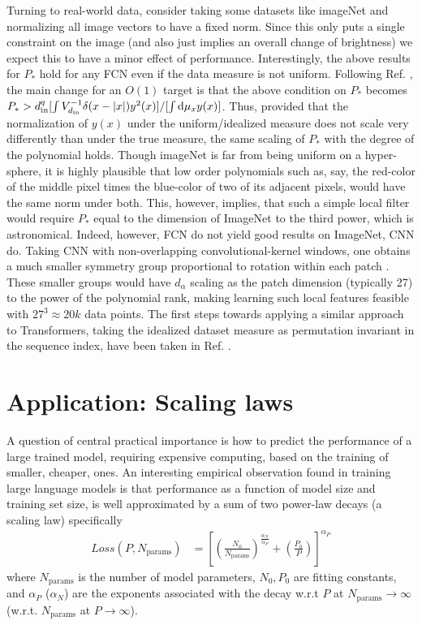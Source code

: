 Turning to real-world data, consider taking some datasets like imageNet and normalizing all image vectors to have a fixed norm. Since this only puts a single constraint on the image (and also just implies an overall change of brightness) we expect this to have a minor effect of performance. Interestingly, the above results for $P_*$ hold for any FCN even if the data measure is not uniform. Following Ref. \cite{lavie2024symmetric}, the main change for an $O(1)$ target is that the above condition on $P_*$ becomes $P_* > d_{\text{in}}^q[\int V_{d_{\text{in}}}^{-1} \delta(x- |x|)  y^2(x)] /[\int \text{d} \mu_x y(x)]$. Thus, provided that the normalization of $y(x)$ under the uniform/idealized measure does not scale very differently than under the true measure, the same scaling of $P_*$ with the degree of the polynomial holds. Though imageNet is far from being uniform on a hyper-sphere, it is highly plausible that low order polynomials such as, say, the red-color of the middle pixel times the blue-color of two of its adjacent pixels, would have the same norm under both. This, however, implies, that such a simple local filter would require $P_*$ equal to the dimension of ImageNet to the third power, which is astronomical. Indeed, however, FCN do not yield good results on ImageNet, CNN do. Taking CNN with non-overlapping convolutional-kernel windows, one obtains a much smaller symmetry group proportional to rotation within each patch \citep{naveh2021self}. These smaller groups would have $d_{\alpha}$ scaling as the patch dimension (typically 27) to the power of the polynomial rank, making learning such local features feasible with $27^3 \approx 20k$ data points. The first steps towards applying a similar approach to Transformers, taking the idealized dataset measure as permutation invariant in the sequence index, have been taken in Ref. \cite{lavie2024towards}.  


\section{Application: Scaling laws}
\label{Sec:ScalingLaws}
A question of central practical importance is how to predict the performance of a large trained model, requiring expensive computing, based on the training of smaller, cheaper, ones. An interesting empirical observation \citep{kaplan2020scalinglawsneurallanguage} found in training large language models is that performance as a function of model size and training set size, is well approximated by a sum of two power-law decays (a scaling law) specifically 
\begin{align}
{Loss}(P,N_{\text{params}}) &= \left[ \left(\frac{N_0}{N_{\text{params}}}\right)^{\frac{\alpha_{N}}{\alpha_P}}+\left(\frac{P_0}{P} \right) \right]^{\alpha_{P}}
\end{align}
where $N_{\text{params}}$ is the number of model parameters, $N_0,P_0$ are fitting constants, and $\alpha_P$ ($\alpha_N$) are the exponents associated with the decay w.r.t $P$ at $N_{\text{params}}
\rightarrow \infty$ (w.r.t. $N_{\text{params}}$ at $P \rightarrow \infty$). 

